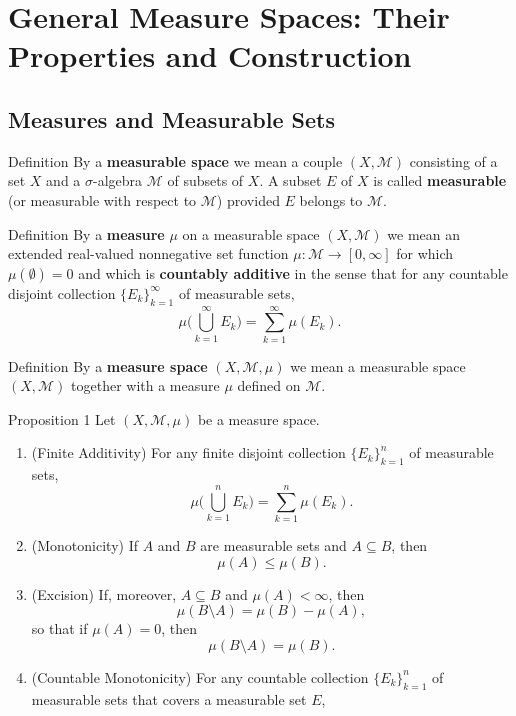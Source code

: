\chapter{General Measure Spaces: Their Properties and Construction}

\section{Measures and Measurable Sets}
\begin{flushleft}
	\begin{namedthm*}{Definition}
		By a \textbf{measurable space} we mean a couple $(X,\mathcal{M})$ consisting of a set $X$ and a $\sigma$-algebra $\mathcal{M}$ of subsets of $X$.
		A subset $E$ of $X$ is called \textbf{measurable} (or measurable with respect to $\mathcal{M}$) provided $E$ belongs to $\mathcal{M}$.
	\end{namedthm*}
	\begin{namedthm*}{Definition}
		By a \textbf{measure} $\mu$ on a measurable space $(X,\mathcal{M})$ we mean an extended real-valued nonnegative set function $\mu:\mathcal{M}\to[0,\infty]$ for which $\mu(\emptyset)=0$ and which is \textbf{countably additive} in the sense that for any countable disjoint collection $\{E_k\}_{k=1}^\infty$ of measurable sets,
		\[
			\mu\biggl(\bigcup_{k=1}^\infty E_k\biggr)=\sum_{k=1}^\infty\mu(E_k).	
		\]
	\end{namedthm*}
	\begin{namedthm*}{Definition}
		By a \textbf{measure space} $(X,\mathcal{M},\mu)$ we mean a measurable space $(X,\mathcal{M})$ together with a measure $\mu$ defined on $\mathcal{M}$.
	\end{namedthm*}
	\begin{namedthm*}{Proposition 1}
		Let $(X,\mathcal{M},\mu)$ be a measure space.
		\begin{enumerate}[\indent {}]
			\item (Finite Additivity) For any finite disjoint collection $\{E_k\}_{k=1}^n$ of measurable sets,
			\[
				\mu\biggl(\bigcup_{k=1}^n E_k\biggr)=\sum_{k=1}^n\mu(E_k).	
			\]
			\item (Monotonicity) If $A$ and $B$ are measurable sets and $A\subseteq B$, then
			\[
				\mu(A)\le\mu(B).
			\]
			\item (Excision) If, moreover, $A\subseteq B$ and $\mu(A)<\infty$, then
			\[
				\mu(B\setminus A)=\mu(B)-\mu(A),
			\]
			so that if $\mu(A)=0$, then
			\[
				\mu(B\setminus A)=\mu(B).
			\]
			\item (Countable Monotonicity) For any countable collection $\{E_k\}_{k=1}^n$ of measurable sets that covers a measurable set $E$,

\end{enumerate}
\end{namedthm*}
\end{flushleft}
